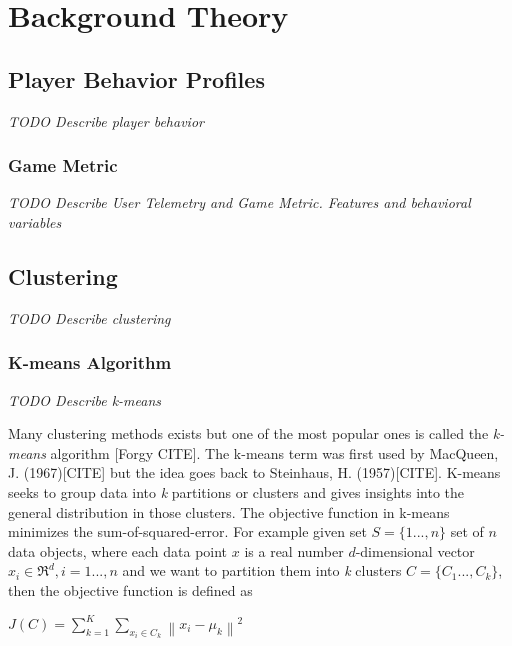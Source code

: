 
\chapter{Background Theory} %
\label{Chapter2}


\section{Player Behavior Profiles}
\textit{TODO Describe player behavior}

\lipsum[1-2]

\subsection{Game Metric}

\textit{TODO Describe User Telemetry and Game Metric. Features and behavioral variables}

\lipsum[2-3]

\section{Clustering}
\textit{TODO Describe clustering}

\lipsum[4-5]

\subsection{K-means Algorithm}
\textit{TODO Describe k-means}

Many clustering methods exists but one of the most popular ones is called the \textit{k-means} algorithm [Forgy CITE]. The k-means term was first used by MacQueen, J. (1967)[CITE] but the idea goes back to Steinhaus, H. (1957)[CITE]. K-means seeks to group data into \textit{k} partitions or clusters and gives insights into the general distribution in those clusters. The objective function in k-means minimizes the sum-of-squared-error. For example given set $S=\{1...,n\}$ set of $n$ data objects, where each data point $x$ is a real number $d$-dimensional vector $x_i \in \Re^d, i=1...,n$ and we want to partition them into \textit{k} clusters $C=\{C_1...,C_k\}$, then the objective function is defined as


\begin{center}
$J(C)=\displaystyle \sum_{k=1}^{K}\displaystyle \sum_{x_i \in C_k}\left \| x_i-\mu_k \right \|^2$ 
\end{center}

